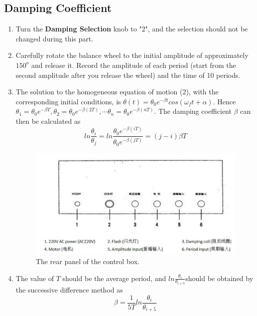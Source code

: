 \documentclass[12pt]{article}
\begin{document}
\subsection{Damping Coefficient}
\begin{enumerate}
\item Turn the \textbf{Damping Selection} knob to "2", and the selection should not be changed during this part.
\item Carefully rotate the balance wheel to the initial amplitude of approximately $150^o$ and release it. Record the amplitude of each period (start from the second amplitude after you release the wheel) and the time of 10 periods.
\item The solution to the homogeneous equation of motion (2), with the corresponding initial conditions, is $\theta(t)=\theta_0e^{-\beta t}cos(\omega_ft+\alpha)$. Hence $\theta_1=\theta_0e^{-\beta T},\theta_2=\theta_0e^{-\beta(2T)},\cdots\theta_n=\theta_0e^{-\beta(nT)}$. The damping coefficient $\beta$ can then be calculated as 
$$ln\frac{\theta_i}{\theta_j}=ln\frac{\theta_0e^{-\beta(iT)}}{\theta_0e^{-\beta(jT)}}=(j-i)\beta T$$
\begin{figure}[H]
\includegraphics[scale=0.4]{P4.jpg}
\centering
\caption{The rear panel of the control box.}
\end{figure}
\item The value of $T$ should be the average period, and $ln\frac{\theta_i}{\theta_{i+5}}$should be obtained by the successive difference method as
$$\beta=\frac{1}{5T}ln\frac{\theta_i}{\theta_{i+5}}$$
\end{enumerate}
\end{document}
